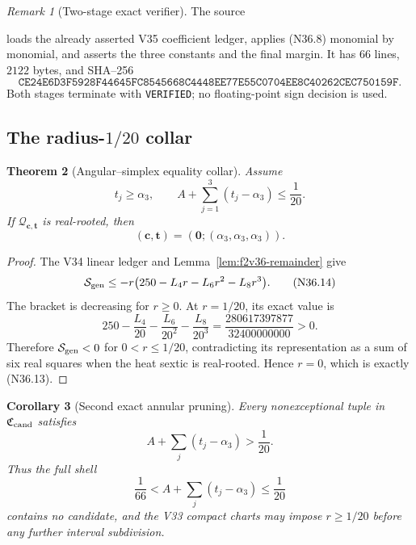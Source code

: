 \documentclass[11pt]{article}
\newtheorem{theorem}{Theorem}[section]
\newtheorem{corollary}[theorem]{Corollary}
\theoremstyle{definition}
\theoremstyle{remark}
\newtheorem{remark}[theorem]{Remark}
\begin{document}
\begin{remark}[Two-stage exact verifier]
\label{rem:f2v36-verifier}
The source
\begin{center}
\end{center}
loads the already asserted V35 coefficient ledger, applies
\textup{(N36.8)} monomial by monomial, and asserts the three constants and
the final margin.  It has \(66\) lines, \(2122\) bytes, and SHA--256
\[
\texttt{CE24E6D3F5928F44645FC8545668C4448EE77E55C0704EE8C40262CEC750159F}.
\tag{N36.11}
\]
Both stages terminate with \texttt{VERIFIED}; no floating-point sign
decision is used.
\end{remark}

\subsection{The radius-\texorpdfstring{\(1/20\)}{1/20} collar}

\begin{theorem}[Angular--simplex equality collar]
\label{thm:f2v36-collar}
Assume
\[
 t_j\geq\alpha_3,\qquad
 A+\sum_{j=1}^3(t_j-\alpha_3)\leq\frac1{20}.
\tag{N36.12}
\]
If \(\mathcal Q_{\bm c,\bm t}\) is real-rooted, then
\[
 (\bm c,\bm t)=(\bm0;(\alpha_3,\alpha_3,\alpha_3)).
\tag{N36.13}
\]
\end{theorem}

\begin{proof}
The V34 linear ledger and Lemma~\ref{lem:f2v36-remainder} give
\[
 \mathcal S_{\rm gen}
 \leq-r\bigl(250-L_4r-L_6r^2-L_8r^3\bigr).
\tag{N36.14}
\]
The bracket is decreasing for \(r\geq0\).  At \(r=1/20\), its exact value
is
\[
 250-\frac{L_4}{20}-\frac{L_6}{20^2}-\frac{L_8}{20^3}
 =\frac{280617397877}{32400000000}>0.
\tag{N36.15}
\]
Therefore \(\mathcal S_{\rm gen}<0\) for \(0<r\leq1/20\), contradicting
its representation as a sum of six real squares when the heat sextic is
real-rooted.  Hence \(r=0\), which is exactly \textup{(N36.13)}.
\end{proof}

\begin{corollary}[Second exact annular pruning]
\label{cor:f2v36-annular-pruning}
Every nonexceptional tuple in \(\mathfrak C_{\rm cand}\) satisfies
\[
 \boxed{A+\sum_j(t_j-\alpha_3)>\frac1{20}.}
\tag{N36.16}
\]
Thus the full shell
\[
 \frac1{66}<A+\sum_j(t_j-\alpha_3)\leq\frac1{20}
\tag{N36.17}
\]
contains no candidate, and the V33 compact charts may impose
\(r\geq1/20\) before any further interval subdivision.
\end{corollary}
\end{document}
